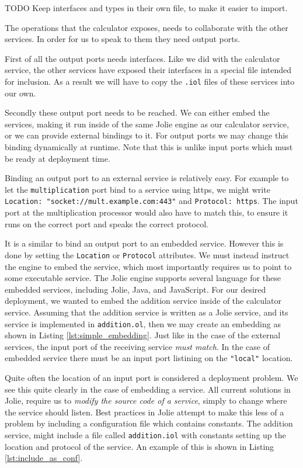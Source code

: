 \begin{observation}
    TODO Keep interfaces and types in their own file, to make it easier to
    import.
\end{observation}

The operations that the calculator exposes, needs to collaborate with the other
services. In order for us to speak to them they need output ports.

First of all the output ports needs interfaces. Like we did with the calculator
service, the other services have exposed their interfaces in a special file
intended for inclusion. As a result we will have to copy the
\texttt{.iol} files of these services into our own.

Secondly these output port needs to be reached. We can either embed the
services, making it run inside of the same Jolie engine as our calculator
service, or we can provide external bindings to it. For output ports we may
change this binding dynamically at runtime. Note that this is unlike input
ports which must be ready at deployment time.

Binding an output port to an external service is relatively easy. For example
to let the \verb!multiplication! port bind to a service using https, we might
write \texttt{Location: "socket://mult.example.com:443"} and
\texttt{Protocol: https}. The input port at the multiplication processor
would also have to match this, to ensure it runs on the correct port and speaks
the correct protocol.

It is a similar to bind an output port to an embedded service. However this is
done by setting the \texttt{Location} or \texttt{Protocol}
attributes. We must instead instruct the engine to embed the service, which
most importantly requires us to point to some executable service. The Jolie
engine supports several language for these embedded services, including Jolie,
Java, and JavaScript. For our desired deployment, we wanted to embed the
addition service inside of the calculator service. Assuming that the addition
service is written as a Jolie service, and its service is implemented in
\texttt{addition.ol}, then we may create an embedding as shown in
Listing \ref{lst:simple_embedding}. Just like in the case of the external
services, the input port of the receiving service \emph{must match}. In the
case of embedded service there must be an input port listining on the
\texttt{"local"} location.

Quite often the location of an input port is considered a deployment problem.
We see this quite clearly in the case of embedding a service. All current
solutions in Jolie, require us to \emph{modify the source code of a service},
simply to change where the service should listen. Best practices in Jolie
attempt to make this less of a problem by including a configuration file which
contains constants. The addition service, might include a file called
\verb!addition.iol! with constants setting up the location and protocol
of the service. An example of this is shown in Listing
\ref{lst:include_as_conf}.

